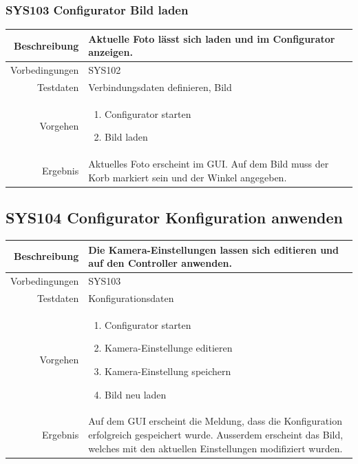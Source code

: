 \subsubsection{SYS103 Configurator Bild laden }
\begin{table}[h!]
	\renewcommand{\arraystretch}{1.5}
	\begin{tabular}{|r|p{14cm}|}
		\hline Beschreibung & Aktuelle Foto lässt sich laden und im Configurator anzeigen. \\ 
		\hline Vorbedingungen & SYS102 \\ 
		\hline Testdaten & Verbindungsdaten definieren, Bild \\ 
		\hline Vorgehen & 
		\begin{enumerate}
			\item Configurator starten
			\item Bild laden
		\end{enumerate} \\ 
		\hline Ergebnis & Aktuelles Foto erscheint im GUI. Auf dem Bild muss der Korb markiert sein und der Winkel angegeben. \\ 
		\hline 
	\end{tabular}
\end{table}

\subsection{SYS104 Configurator Konfiguration anwenden }
\begin{table}[h!]
	\renewcommand{\arraystretch}{1.5}
	\begin{tabular}{|r|p{14cm}|}
		\hline Beschreibung & Die Kamera-Einstellungen lassen sich editieren und auf den Controller anwenden. \\ 
		\hline Vorbedingungen & SYS103 \\ 
		\hline Testdaten & Konfigurationsdaten \\ 
		\hline Vorgehen & 
		\begin{enumerate}
			\item Configurator starten
			\item Kamera-Einstellunge editieren
			\item Kamera-Einstellung speichern
			\item Bild neu laden
		\end{enumerate} \\ 
		\hline Ergebnis & Auf dem GUI erscheint die Meldung, dass die Konfiguration erfolgreich gespeichert wurde.
		Ausserdem erscheint das Bild, welches mit den aktuellen Einstellungen modifiziert wurden. \\ 
		\hline 
	\end{tabular}
\end{table}
